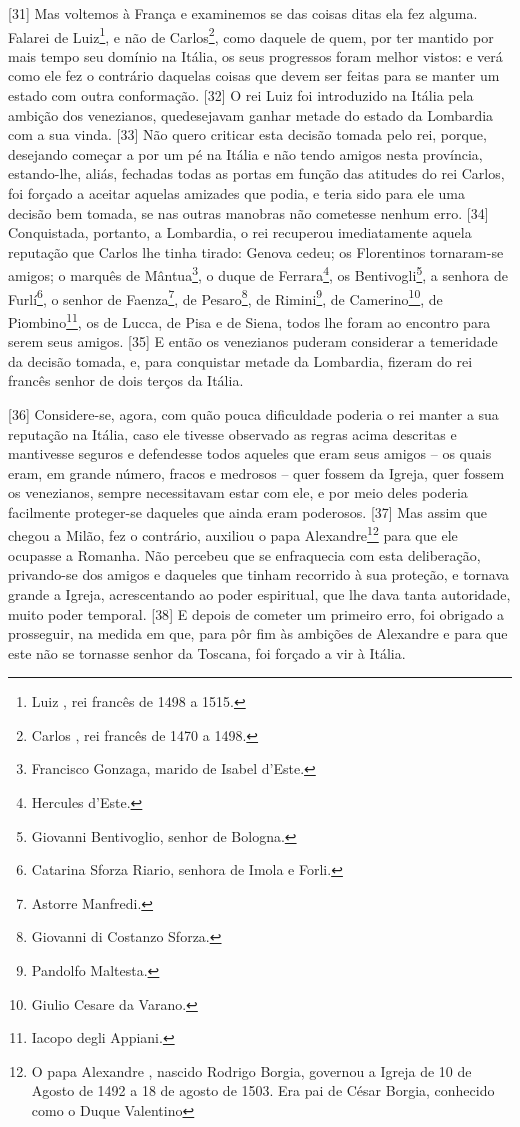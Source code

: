 {[}31{]} Mas voltemos à França e examinemos se das coisas ditas ela fez
alguma. Falarei de Luiz\footnote{Luiz , rei francês de 1498 a 1515.},
e não de Carlos\footnote{Carlos , rei francês de 1470 a 1498.}, como
daquele de quem, por ter mantido por mais tempo seu domínio na Itália,
os seus progressos foram melhor vistos: e verá como ele fez o contrário
daquelas coisas que devem ser feitas para se manter um estado com outra
conformação. {[}32{]} O rei Luiz foi introduzido na Itália pela ambição
dos venezianos, quedesejavam ganhar metade do estado da Lombardia com a
sua vinda. {[}33{]} Não quero criticar esta decisão tomada pelo rei,
porque, desejando começar a por um pé na Itália e não tendo amigos nesta
província, estando-lhe, aliás, fechadas todas as portas em função das
atitudes do rei Carlos, foi forçado a aceitar aquelas amizades que
podia, e teria sido para ele uma decisão bem tomada, se nas outras
manobras não cometesse nenhum erro. {[}34{]} Conquistada, portanto, a
Lombardia, o rei recuperou imediatamente aquela reputação que Carlos lhe
tinha tirado: Genova cedeu; os Florentinos tornaram-se amigos; o marquês
de Mântua\footnote{Francisco Gonzaga, marido de Isabel d'Este.}, o duque
de Ferrara\footnote{Hercules  d'Este.}, os Bentivogli\footnote{Giovanni
  Bentivoglio, senhor de Bologna.}, a senhora de Furlí\footnote{Catarina
  Sforza Riario, senhora de Imola e Forli.}, o senhor de
Faenza\footnote{Astorre Manfredi.}, de Pesaro\footnote{Giovanni di
  Costanzo Sforza.}, de Rimini\footnote{Pandolfo Maltesta.}, de
Camerino\footnote{Giulio Cesare da Varano.}, de Piombino\footnote{Iacopo
  degli Appiani.}, os de Lucca, de Pisa e de Siena, todos lhe foram ao
encontro para serem seus amigos. {[}35{]} E então os venezianos puderam
considerar a temeridade da decisão tomada, e, para conquistar metade da
Lombardia, fizeram do rei francês senhor de dois terços da Itália.

{[}36{]} Considere-se, agora, com quão pouca dificuldade poderia o rei
manter a sua reputação na Itália, caso ele tivesse observado as regras
acima descritas e mantivesse seguros e defendesse todos aqueles que eram
seus amigos -- os quais eram, em grande número, fracos e medrosos --
quer fossem da Igreja, quer fossem os venezianos, sempre necessitavam
estar com ele, e por meio deles poderia facilmente proteger-se daqueles
que ainda eram poderosos. {[}37{]} Mas assim que chegou a Milão, fez o
contrário, auxiliou o papa Alexandre\footnote{O papa Alexandre ,
  nascido Rodrigo Borgia, governou a Igreja de 10 de Agosto de 1492 a 18
  de agosto de 1503. Era pai de César Borgia, conhecido como o Duque
  Valentino} para que ele ocupasse a Romanha. Não percebeu que se
enfraquecia com esta deliberação, privando-se dos amigos e daqueles que
tinham recorrido à sua proteção, e tornava grande a Igreja,
acrescentando ao poder espiritual, que lhe dava tanta autoridade, muito
poder temporal. {[}38{]} E depois de cometer um primeiro erro, foi
obrigado a prosseguir, na medida em que, para pôr fim às ambições de
Alexandre e para que este não se tornasse senhor da Toscana, foi forçado
a vir à Itália.


